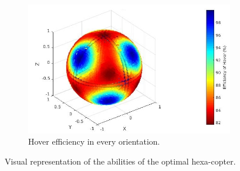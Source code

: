 \begin{figure}[!ht]
\begin{center}
\begin{subfigure}[b]{0.5\textwidth}
    \includegraphics[width=\linewidth]{images/Hexa_hspace.jpg}
    \caption{Hover efficiency in every orientation.} \label{fig:hexa_hspace}
  \end{subfigure}
  \caption{Visual representation of the abilities of the optimal hexa-copter.}
  \label{fig:Hexacopter_spaces}
  \end{center}
\end{figure}

